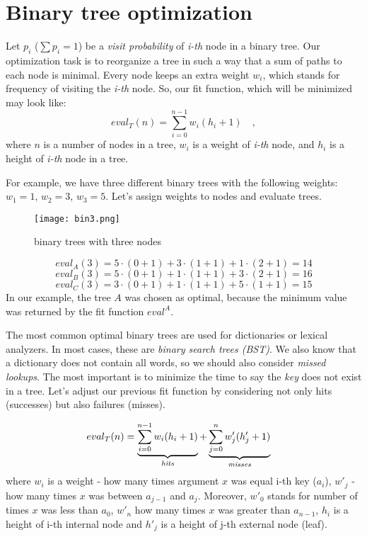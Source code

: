 \documentclass[12pt]{article}
\newcommand{\sumin}[2]{\sum\limits_{#1}^{#2}}
\begin{document}
\section{Binary tree optimization}
Let $p_i$ ($\sum{p_i} = 1$) be a \textit{visit probability} of \textit{i-th} node in a binary tree. Our optimization task is to reorganize a tree in such a way that a sum of paths to each node is minimal. Every node keeps an extra weight $w_i$, which stands for frequency of visiting the \textit{i-th} node.
So, our fit function, which will be minimized may look like:
\begin{equation}
    eval_{T}(n) = \sumin{i=0}{n-1} w_i (h_i + 1)\quad ,
\end{equation}
where $n$ is a number of nodes in a tree, $w_i$ is a weight of \textit{i-th} node, and $h_i$ is a height of \textit{i-th} node in a tree.

For example, we have three different binary trees with the following weights:
$w_1 = 1$, $w_2 = 3$, $w_3 = 5$.
Let's assign weights to nodes and evaluate trees.

\begin{figure}[ht]
\centering
\texttt{[image: bin3.png]}
\caption{binary trees with three nodes}
\label{fig:bin3}
\end{figure}

\begin{equation}
    eval_{A}(3) = 5\cdot (0 + 1) + 3\cdot (1 + 1) + 1\cdot (2 + 1) = 14
\end{equation}
\begin{equation}
    eval_{B}(3) = 5\cdot (0 + 1) + 1\cdot (1 + 1) + 3\cdot (2 + 1) = 16
\end{equation}
\begin{equation}
    eval_{C}(3) = 3\cdot (0 + 1) + 1\cdot (1 + 1) + 5\cdot (1 + 1) = 15
\end{equation}
In our example, the tree $A$ was chosen as optimal, because the minimum value was returned by the fit function $eval^A$.


The most common optimal binary trees are used for dictionaries or lexical analyzers. In most cases, these are \textit{binary search trees (BST)}.
We also know that a dictionary does not contain all words, so we should also consider \textit{missed lookups}. The most important is to minimize the time to say the \textit{key} does not exist in a tree.
Let's adjust our previous fit function by considering not only hits (successes) but also failures (misses).

\[
eval_{T}( n ) = \underbrace{\sumin{i=0}{n-1}w_i (h_i + 1)}_{\emph{hits}} + \underbrace{\sumin{j=0}{n}w'_j (h'_j + 1)}_{\emph{misses}}\quad
\]
where $w_i$ is a weight - how many times argument $x$ was equal i-th key ($a_i$),
$w'_j$ - how many times $x$ was between $a_{j-1}$ and $a_{j}$. Moreover, $w'_0$ stands for number of times $x$ was less than $a_0$, $w'_n$ how many times $x$ was greater than $a_{n-1}$,
$h_i$ is a height of i-th internal node and $h'_j$ is a height of j-th external node (leaf).
\end{document}
